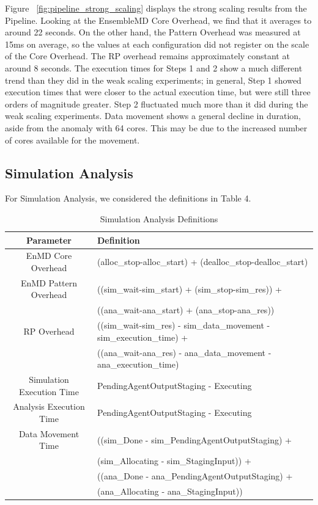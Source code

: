 \documentclass[]{article}
\begin{document}
		Figure ~\ref{fig:pipeline_strong_scaling} displays the strong scaling results from the Pipeline. Looking at the EnsembleMD Core Overhead, we find that it averages to around 22 seconds. On the other hand, the Pattern Overhead was measured at 15ms on average, so the values at each configuration did not register on the scale of the Core Overhead. The RP overhead remains approximately constant at around 8 seconds. The execution times for Steps 1 and 2 show a much different trend than they did in the weak scaling experiments; in general, Step 1 showed execution times that were closer to the actual execution time, but were still three orders of magnitude greater. Step 2 fluctuated much more than it did during the weak scaling experiments.
		Data movement shows a general decline in duration, aside from the anomaly with 64 cores. This may be due to the increased number of cores available for the movement.

	\subsection{Simulation Analysis}

		For Simulation Analysis, we considered the definitions in Table 4.

		\begin{table}[H]
			\centering
			\begin{tabular}{|c|p{10cm}|}
				\hline
				Parameter & Definition  \\
				\hline
				EnMD Core Overhead & (alloc\_stop-alloc\_start) +  (dealloc\_stop-dealloc\_start) \\
				\hline
				EnMD Pattern Overhead & ((sim\_wait-sim\_start) + (sim\_stop-sim\_res)) + \\ 
									  &	((ana\_wait-ana\_start) + (ana\_stop-ana\_res)) \\
				\hline
				RP Overhead & ((sim\_wait-sim\_res) - sim\_data\_movement - sim\_execution\_time) + \\
							&	((ana\_wait-ana\_res) - ana\_data\_movement - ana\_execution\_time) \\
				\hline
				Simulation Execution Time & PendingAgentOutputStaging - Executing \\
				\hline
				Analysis Execution Time & PendingAgentOutputStaging - Executing \\
				\hline
				Data Movement Time & ((sim\_Done - sim\_PendingAgentOutputStaging) + \\ 
								   &	(sim\_Allocating - sim\_StagingInput)) + \\
								   &	((ana\_Done - ana\_PendingAgentOutputStaging) + \\
								   &	(ana\_Allocating - ana\_StagingInput)) \\
				\hline
			\end{tabular}
			\caption{Simulation Analysis Definitions}
			\label{table:sa_definitions}
		\end{table}
\end{document}
